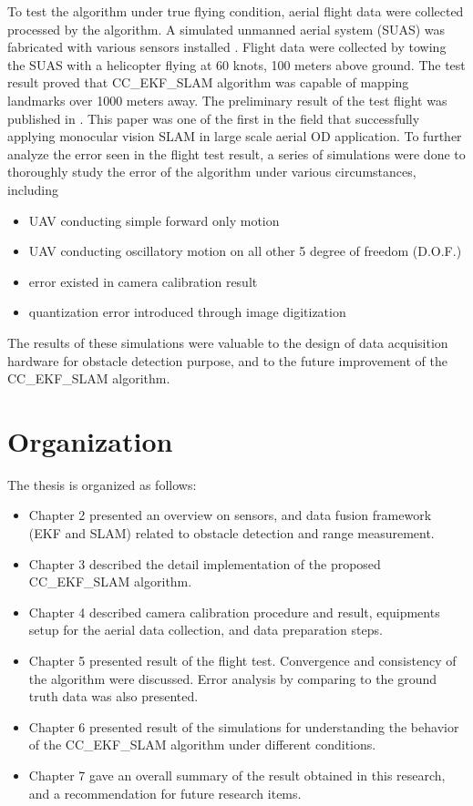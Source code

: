 To test the algorithm under true flying condition, aerial flight data
were collected processed by the algorithm. A simulated unmanned aerial
system (SUAS) was fabricated with various sensors installed . Flight
data were collected by towing the SUAS with a helicopter flying at 60
knots, 100 meters above ground. The test result proved that
CC\_EKF\_SLAM algorithm was capable of mapping landmarks over 1000
meters away. The preliminary result of the test flight was published
in \cite{zhang_obstacle_2012}. This paper was one of the first in the
field that successfully applying monocular vision SLAM in large scale
aerial OD application. To further analyze the error seen in the flight
test result, a series of simulations were done to thoroughly study the
error of the algorithm under various circumstances, including
\begin{itemize}
\item UAV conducting simple forward only motion
\item UAV conducting oscillatory motion on all other 5 degree of
freedom (D.O.F.)
\item error existed in camera calibration result
\item quantization error introduced through image digitization 
\end{itemize}
The results of these simulations were valuable to the design of data
acquisition hardware for obstacle detection purpose, and to the future
improvement of the CC\_EKF\_SLAM algorithm.

\section{Organization}\label{section:Organization}
The thesis is organized as follows:

\begin{itemize}
  \item Chapter 2 presented an overview on sensors, and data fusion
  framework (EKF and SLAM) related to obstacle detection and range
  measurement.
  \item Chapter 3 described the detail implementation of the proposed
  CC\_EKF\_SLAM algorithm.
  \item Chapter 4 described camera calibration procedure and result,
  equipments setup for the aerial data collection, and data
  preparation steps.
  \item Chapter 5 presented result of the flight test. Convergence and
  consistency of the algorithm were discussed. Error analysis by
  comparing to the ground truth data was also presented.
  \item Chapter 6 presented result of the simulations for understanding
  the behavior of the CC\_EKF\_SLAM algorithm under different
  conditions.
  \item Chapter 7 gave an overall summary of the result obtained in
  this research, and a recommendation for future research items.
\end{itemize}


